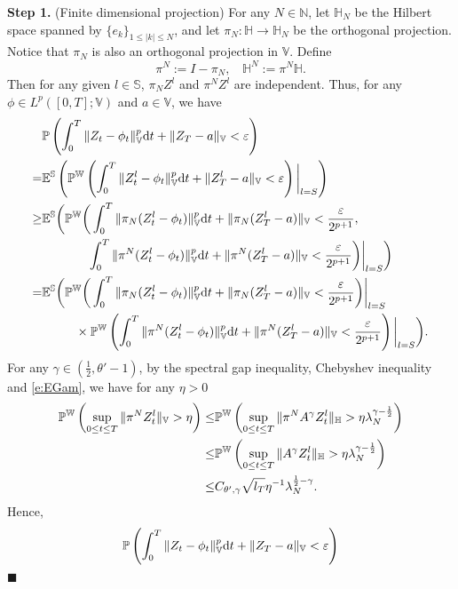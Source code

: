 \documentclass[12pt,a4paper]{article}
\theoremstyle{definition}
\theoremstyle{remark}
\numberwithin{equation}{section}
\newcommand{\e}{\varepsilon}
\newcommand{\HH}{\mathbb{H}}
\newcommand{\VV}{\mathbb{V}}
\newcommand{\N}{\mathbb{N}}
\newcommand{\PP}{\mathbb{P}}
\newcommand{\dif}{{\rm d}}
\def\EE{\mathbb{E}}\def\GG{\mathbb G}\def\HH{\mathbb H}\def\KK{\mathbb K}
\def\SS{\mathbb S}
\newenvironment{proof}{\par\noindent{\bf Proof:}}{\hspace*{\fill}$\blacksquare$\par}
\begin{document}
{\begin{proof}
{\bf Step 1.} (Finite dimensional projection) For  any $N \in \N$, let $\HH_N$ be the Hilbert space spanned by $\{e_k\}_{ 1\le |k| \le N}$, and let
$\pi_N: \HH \rightarrow \HH_N$ be the orthogonal projection.  Notice that $\pi_N$ is also an orthogonal projection in $\VV$.
Define
$$\pi^N:=I-\pi_N, \ \ \ \ \HH^N:=\pi^N \HH.$$
Then for  any given $l\in\SS$,  $\pi_N Z^l$ and $\pi^N Z^l$ are independent. Thus,  for any $\phi\in L^p([0,T];\VV)$ and  $a\in \VV$, we have
\begin{align*}
&  \PP\left(\int_0^T \|Z_t-\phi_t\|_{\VV}^p \dif t+\|Z_T-a\|_{\VV}<\e\right) \\
=& \EE^{\SS}\left(\PP^{\WW}\left(\int_0^T \|Z^l_t-\phi_t\|_{\VV}^p \dif t+\|Z^l_T-a\|_{\VV}<\e\right)\bigg|_{l=S}\right) \\
\ge &\EE^{\SS}\bigg(\PP^{\WW}\bigg(\int_0^T \|\pi_N(Z^l_t-\phi_t)\|_{\VV}^p \dif t+\|\pi_N(Z^l_T-a)\|_{\VV}<\frac{\e}{2^{p+1}}, \\
& \ \ \ \ \ \ \ \ \  \ \ \int_0^T \|\pi^N(Z^l_t-\phi_t)\|_{\VV}^p \dif t+\|\pi^N(Z^l_T-a)\|_{\VV}<\frac{\e}{2^{p+1}}\bigg) \bigg|_{l=S}\bigg) \\
=&\EE^{\SS}\bigg(\PP^{\WW}\bigg(\int_0^T \|\pi_N(Z^l_t-\phi_t)\|_{\VV}^p \dif t+\|\pi_N(Z^l_T-a)\|_{\VV}<\frac{\e}{2^{p+1}}\bigg)\bigg|_{l=S} \\
&\ \ \ \ \ \ \ \    \times \PP^{\WW}\left(\int_0^T \|\pi^N(Z^l_t-\phi_t)\|_{\VV}^p \dif t+\|\pi^N(Z^l_T-a)\|_{\VV}<\frac{\e}{2^{p+1}}\right)\bigg|_{l=S}\bigg).
\end{align*}
For any $\gamma \in (\frac 12, \theta'-1)$,
by the spectral gap inequality, Chebyshev inequality and \eqref{e:EGam}, we have for any $\eta>0$
\begin{align*}
\PP^{\WW}\left(\sup_{0 \le t \le T} \|\pi^N Z^l_t\|_{\VV}>{\eta}\right)
 \le &\PP^{\WW}\left(\sup_{0 \le t \le T} \|\pi^N A^{\gamma} Z^l_t\|_{\HH}>{\eta} \lambda^{\gamma-\frac 12}_N\right) \notag \\
 \le &\PP^{\WW}\left(\sup_{0 \le t \le T} \|A^{\gamma} Z^l_t\|_{\HH}>{\eta} \lambda^{\gamma-\frac 12}_N\right)  \notag \\
 \le & C_{\theta',\gamma} \sqrt{l_T} {\eta}^{-1} \lambda_N^{\frac12-\gamma}. \notag
\end{align*}
Hence,
\begin{align*}
&  \PP\left(\int_0^T \|Z_t-\phi_t\|_{\VV}^p \dif t+\|Z_T-a\|_{\VV}<\e\right) \\

\end{align*}
\end{proof}}
\end{document}
